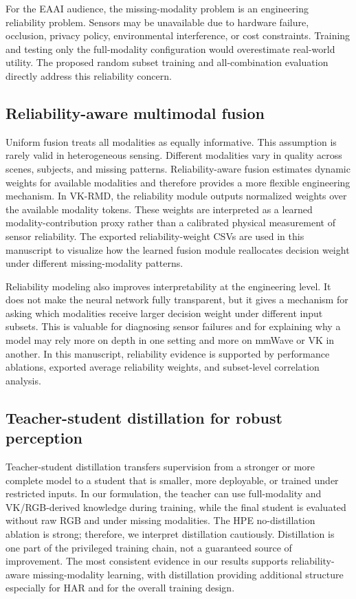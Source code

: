 \documentclass[preprint,12pt]{elsarticle}
\newcommand{\method}{VK-RMD}
\begin{document}
For the EAAI audience, the missing-modality problem is an engineering reliability problem. Sensors may be unavailable due to hardware failure, occlusion, privacy policy, environmental interference, or cost constraints. Training and testing only the full-modality configuration would overestimate real-world utility. The proposed random subset training and all-combination evaluation directly address this reliability concern.

\subsection{Reliability-aware multimodal fusion}

Uniform fusion treats all modalities as equally informative. This assumption is rarely valid in heterogeneous sensing. Different modalities vary in quality across scenes, subjects, and missing patterns. Reliability-aware fusion estimates dynamic weights for available modalities and therefore provides a more flexible engineering mechanism. In \method, the reliability module outputs normalized weights over the available modality tokens. These weights are interpreted as a learned modality-contribution proxy rather than a calibrated physical measurement of sensor reliability. The exported reliability-weight CSVs are used in this manuscript to visualize how the learned fusion module reallocates decision weight under different missing-modality patterns.

Reliability modeling also improves interpretability at the engineering level. It does not make the neural network fully transparent, but it gives a mechanism for asking which modalities receive larger decision weight under different input subsets. This is valuable for diagnosing sensor failures and for explaining why a model may rely more on depth in one setting and more on mmWave or VK in another. In this manuscript, reliability evidence is supported by performance ablations, exported average reliability weights, and subset-level correlation analysis.

\subsection{Teacher-student distillation for robust perception}

Teacher-student distillation transfers supervision from a stronger or more complete model to a student that is smaller, more deployable, or trained under restricted inputs. In our formulation, the teacher can use full-modality and VK/RGB-derived knowledge during training, while the final student is evaluated without raw RGB and under missing modalities. The HPE no-distillation ablation is strong; therefore, we interpret distillation cautiously. Distillation is one part of the privileged training chain, not a guaranteed source of improvement. The most consistent evidence in our results supports reliability-aware missing-modality learning, with distillation providing additional structure especially for HAR and for the overall training design.
\end{document}
